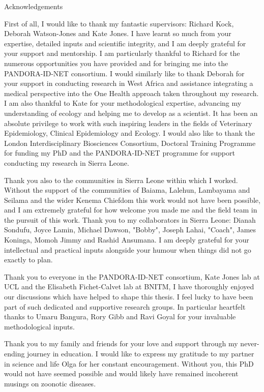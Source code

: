 \newpage

\Large

Acknowledgements

\normalsize

First of all, I would like to thank my fantastic supervisors: Richard Kock, Deborah Watson-Jones and Kate Jones. I have learnt so much from your expertise, detailed inputs and scientific integrity, and I am deeply grateful for your support and mentorship. I am particularly thankful to Richard for the numerous opportunities you have provided and for bringing me into the PANDORA-ID-NET consortium. I would similarly like to thank Deborah for your support in conducting research in West Africa and assistance integrating a medical perspective into the One Health approach taken throughout my research. I am also thankful to  Kate for your methodological expertise, advancing my understanding of ecology and helping me to develop as a scientist. It has been an absolute privilege to work with such inspiring leaders in the fields of Veterinary Epidemiology, Clinical Epidemiology and Ecology. I would also like to thank the London Interdisciplinary Biosciences Consortium, Doctoral Training Programme for funding my PhD and the PANDORA-ID-NET programme for support conducting my research in Sierra Leone.
\par
Thank you also to the communities in Sierra Leone within which I worked. Without the support of the communities of Baiama, Lalehun, Lambayama and Seilama and the wider Kenema Chiefdom this work would not have been possible, and I am extremely grateful for how welcome you made me and the field team in the pursuit of this work. Thank you to my collaborators in Sierra Leone: Dianah Sondufu, Joyce Lamin, Michael Dawson, "Bobby", Joseph Lahai, "Coach", James Koninga, Momoh Jimmy and Rashid Ansumana. I am deeply grateful for your intellectual and practical inputs alongside your humour when things did not go exactly to plan.
\par
Thank you to everyone in the PANDORA-ID-NET consortium, Kate Jones lab at UCL and the Elisabeth Fichet-Calvet lab at BNITM, I have thoroughly enjoyed our discussions which have helped to shape this thesis. I feel lucky to have been part of such dedicated and supportive research groups. In particular heartfelt thanks to Umaru Bangura, Rory Gibb and Ravi Goyal for your invaluable methodological inputs.
\par
Thank you to my family and friends for your love and support through my never-ending journey in education. I would like to express my gratitude to my partner in science and life Olga for her constant encouragement. Without you, this PhD would not have seemed possible and would likely have remained incoherent musings on zoonotic diseases.

\newpage